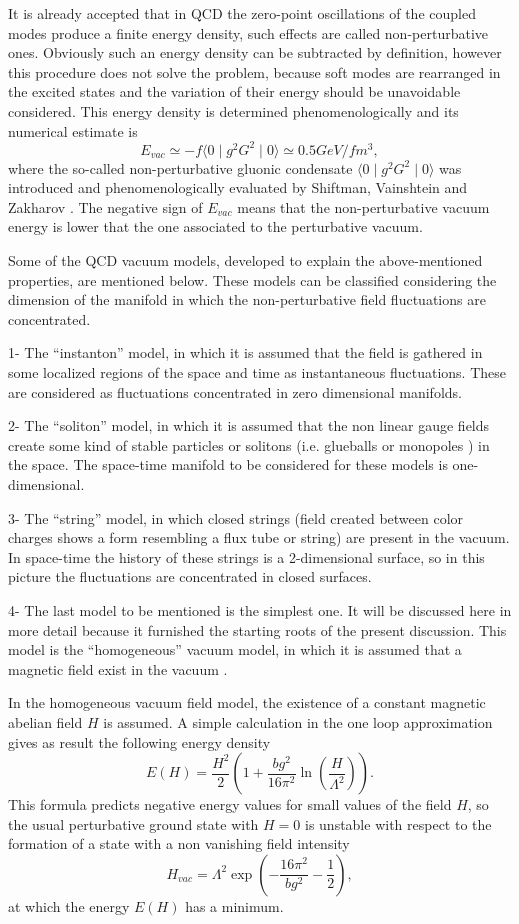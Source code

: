 \documentclass[12pt,letterpaper]{report}
\begin{document}
It is already accepted that in QCD the zero-point oscillations of
the coupled modes produce a finite energy density, such effects
are called non-perturbative ones. Obviously such an energy density
can be subtracted by definition, however this procedure does not
solve the problem, because soft modes are rearranged in the
excited states and the variation of their energy should be
unavoidable considered. This energy density is determined
phenomenologically and its numerical estimate is \cite{Shuryak}
\[
E_{vac}\simeq -f\langle 0\mid g^2G^2\mid 0\rangle \simeq
0.5GeV/fm^3,
\]
where the so-called non-perturbative gluonic condensate $\langle
0\mid g^2G^2\mid 0\rangle$ was introduced and phenomenologically
evaluated by Shiftman, Vainshtein and Zakharov \cite{Zakharov}.
The negative sign of $ E_{vac}$ means that the non-perturbative
vacuum energy is lower that the one associated to the perturbative
vacuum.

Some of the QCD vacuum models, developed to explain the
above-mentioned properties, are mentioned below. These models can
be classified considering the dimension of the manifold in which
the non-perturbative field fluctuations are concentrated.

1- The ``instanton'' model, in which it is assumed that the field
is gathered in some localized regions of the space and time as
instantaneous fluctuations. These are considered as fluctuations
concentrated in zero dimensional manifolds.

2- The ``soliton'' model, in which it is assumed that the non
linear gauge fields create some kind of stable particles or
solitons (i.e. glueballs \cite{Hansson} or monopoles
\cite{Mandelstam}) in the space. The space-time manifold to be
considered for these models is one-dimensional.

3- The ``string'' model, in which closed strings (field created
between color charges shows a form resembling a flux tube or
string) are present in the vacuum. In space-time the history of
these strings is a 2-dimensional surface, so in this picture the
fluctuations are concentrated in closed surfaces.

4- The last model to be mentioned is the simplest one. It will be
discussed here in more detail because it furnished the starting
roots of the present discussion. This model is the ``homogeneous''
vacuum model, in which it is assumed that a magnetic field exist
in the vacuum \cite{Savv1}.

In the homogeneous vacuum field model, the existence of a constant
magnetic abelian field $H$ is assumed. A simple calculation in the
one loop approximation gives as result the following energy
density \cite{Shuryak}
\[
E\left(H\right) =\frac{H^2}2\left(1+\frac{bg^2}{16\pi ^2}\ln
\left(\frac H{\Lambda ^2}\right) \right).
\]
This formula predicts negative energy values for small values of
the field $ H $, so the usual perturbative ground state with $H=0$
is unstable with respect to the formation of a state with a non
vanishing field intensity \cite{Shuryak}
\[
H_{vac}=\Lambda ^2\exp \left(-\frac{16\pi ^2}{bg^2}-\frac
12\right),
\]
at which the energy $E\left(H\right)$ has a minimum.
\end{document}
